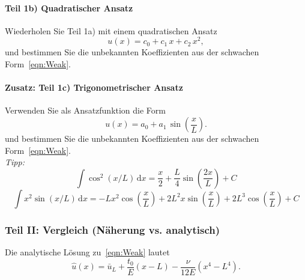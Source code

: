 \documentclass[12pt, a4paper]{article}              %
\begin{document}
\newpage
\paragraph{Teil 1b) Quadratischer Ansatz}
Wiederholen Sie Teil 1a) mit einem quadratischen Ansatz
\begin{equation}\label{eqn:TrialQuad}
  u(x) = c_0 + c_1\,x + c_2\,x^2,
\end{equation}
und bestimmen Sie die unbekannten Koeffizienten aus der schwachen Form~\eqref{eqn:Weak}. %


\paragraph{Zusatz: Teil 1c) Trigonometrischer Ansatz}
Verwenden Sie als Ansatzfunktion die Form
\begin{equation}\label{eqn:TrialSin}
  u(x) = a_0 + a_1\,\sin\!\left(\frac{x}{L}\right).
\end{equation}
und bestimmen Sie die unbekannten Koeffizienten aus der schwachen Form~\eqref{eqn:Weak}. %
\\

\emph{Tipp:}
\begin{equation}
\int \cos^2(x/L)\,\mathrm{d}x=\frac{x}{2}+\frac{L}{4}\sin\!\left(\frac{2x}{L}\right)+C
\end{equation}
\begin{equation}
\int x^2\sin(x/L)\,\mathrm{d}x=-Lx^2\cos\!\left(\frac{x}{L}\right)+2L^2x\sin\!\left(\frac{x}{L}\right)+2L^3\cos\!\left(\frac{x}{L}\right)+C
\end{equation}




\newpage
\subsubsection*{Teil II: Vergleich (Näherung vs. analytisch)}
Die analytische Lösung zu~\eqref{eqn:Weak} lautet
  \begin{equation}\label{eqn:Solution}
    \hat{u}(x) = \bar{u}_L + \frac{t_0}{E}(x - L) - \frac{\nu}{12 E}(x^4 - L^4).
  \end{equation}
\end{document}
